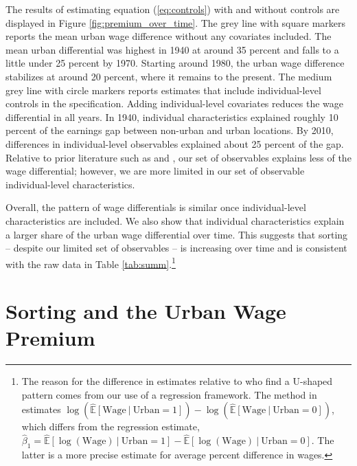 \documentclass[12pt]{article}
\begin{document}
The results of estimating equation (\ref{eq:controls}) with and without controls are displayed in Figure \ref{fig:premium_over_time}.
The grey line with square markers reports the mean urban wage difference without any covariates included.
The mean urban differential was highest in 1940 at around 35 percent and falls to a little under 25 percent by 1970.
Starting around 1980, the urban wage difference stabilizes at around 20 percent, where it remains to the present.
The medium grey line with circle markers reports estimates that include individual-level controls in the specification.
Adding individual-level covariates reduces the wage differential in all years.
In 1940, individual characteristics explained roughly 10 percent of the earnings gap between non-urban and urban locations.
By 2010, differences in individual-level observables explained about 25 percent of the gap.
Relative to prior literature such as \citet{Yankow_2006} and \citet{Glaeser_Mare_2001}, our set of observables explains less of the wage differential; however, we are more limited in our set of observable individual-level characteristics. 

Overall, the pattern of wage differentials is similar once individual-level characteristics are included.
We also show that individual characteristics explain a larger share of the urban wage differential over time.
This suggests that sorting -- despite our limited set of observables -- is increasing over time and is consistent with the raw data in Table \ref{tab:summ}.\footnote{
The reason for the difference in estimates relative to \citet{Boustan_Bunten_Hearey_2013} who find a U-shaped pattern comes from our use of a regression framework.
The method in \citet{Boustan_Bunten_Hearey_2013} estimates $ \log( \hat{\mathbb{E}}[\text{Wage} \ |\  \text{Urban} = 1] ) - \log( \hat{\mathbb{E}}[\text{Wage} \ |\  \text{Urban} = 0] )$, which differs from the regression estimate, $\hat{\beta}_1 = \hat{\mathbb{E}}[ \log(\text{Wage}) \ |\  \text{Urban} = 1] - \hat{\mathbb{E}}[ \log(\text{Wage}) \ |\  \text{Urban} = 0]$.
The latter is a more precise estimate for average percent difference in wages.}

\section{Sorting and the Urban Wage Premium}\label{sec:sorting}
\end{document}
